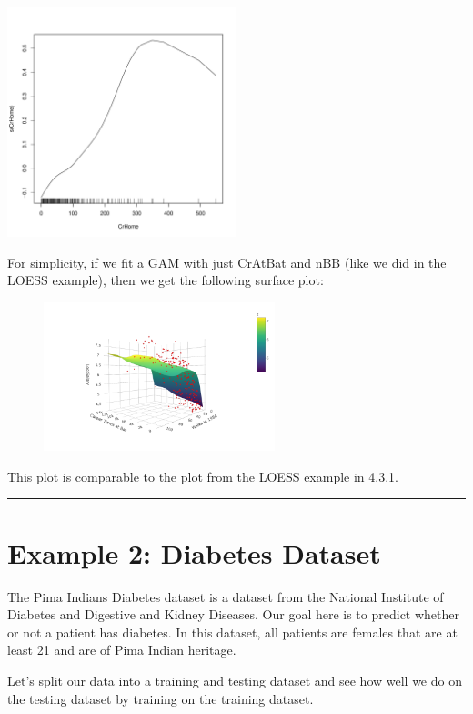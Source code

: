 \documentclass{article}\usepackage[]{graphicx}\usepackage[]{color}
\newenvironment{knitrout}{}{} %
\begin{document}
\begin{knitrout}
\includegraphics[width=0.50\textwidth]{figure/unnamed-chunk-3-9} 

\end{knitrout}

For simplicity, if we fit a GAM with just CrAtBat and nBB (like we did in the LOESS example), then we get the following surface plot:

\begin{figure}[H]
	\centering
	\includegraphics[width=0.6\textwidth]{gam_baseball_demo.png}
	\label{fig:myfig}
\end{figure}

This plot is comparable to the plot from the LOESS example in 4.3.1.

\bigskip
\hrule
\bigskip

\section*{Example 2: Diabetes Dataset}

The Pima Indians Diabetes dataset is a dataset from the National Institute of Diabetes and Digestive and Kidney Diseases. Our goal here is to predict whether or not a patient has diabetes. In this dataset, all patients are females that are at least 21 and are of Pima Indian heritage.

Let's split our data into a training and testing dataset and see how well we do on the testing dataset by training on the training dataset.
\end{document}

